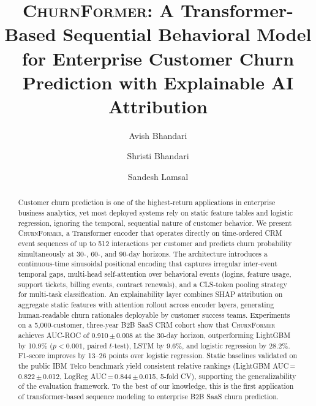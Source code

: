 \documentclass[review, 12pt]{elsarticle}
\newcommand{\model}{\textsc{ChurnFormer}}
\begin{document}
\begin{frontmatter}

\title{\model: A Transformer-Based Sequential Behavioral Model for
  Enterprise Customer Churn Prediction with Explainable AI Attribution}

\author[aff1]{Avish Bhandari}

\author[aff2]{Shristi Bhandari}

\author[aff3]{Sandesh Lamsal}

\address[aff1]{Dakchyata College, Tribhuvan University, Kathmandu, Nepal}

\address[aff2]{College of Natural Resource Management,
  Agriculture and Forestry University (AFU),
  Puranchaur, Kaski, Nepal}

\address[aff3]{Department of Civil and Architectural Engineering,
  University of Miami, Coral Gables, Florida, USA}

\begin{abstract}
Customer churn prediction is one of the highest-return applications in
enterprise business analytics, yet most deployed systems rely on static feature
tables and logistic regression, ignoring the temporal, sequential nature of
customer behavior.
We present \model{}, a Transformer encoder that operates directly on
time-ordered CRM event sequences of up to 512 interactions per customer and
predicts churn probability simultaneously at 30-, 60-, and 90-day horizons.
The architecture introduces a continuous-time sinusoidal positional encoding
that captures irregular inter-event temporal gaps, multi-head self-attention
over behavioral events (logins, feature usage, support tickets, billing events,
contract renewals), and a CLS-token pooling strategy for multi-task
classification.
An explainability layer combines SHAP attribution on aggregate static features
with attention rollout across encoder layers, generating human-readable churn
rationales deployable by customer success teams.
Experiments on a 5{,}000-customer, three-year B2B SaaS CRM cohort show that
\model{} achieves AUC-ROC of 0.910\,$\pm$\,0.008 at the 30-day horizon,
outperforming LightGBM by 10.9\% ($p < 0.001$, paired $t$-test), LSTM by
9.6\%, and logistic regression by 28.2\%.
F1-score improves by 13--26 points over logistic regression.
Static baselines validated on the public IBM Telco benchmark yield
consistent relative rankings (LightGBM AUC\,=\,0.822\,$\pm$\,0.012,
LogReg AUC\,=\,0.844\,$\pm$\,0.015, 5-fold CV), supporting the
generalizability of the evaluation framework.
To the best of our knowledge, this is the first application of
transformer-based sequence modeling to enterprise B2B SaaS churn prediction.
\end{abstract}


\end{frontmatter}
\end{document}
